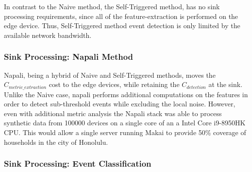 In contrast to the Naive method, the Self-Triggered method, has no sink processing requirements, since all of the feature-extraction is performed on the edge device.
Thus, Self-Triggered method event detection is only limited by the available network bandwidth.

\subsubsection{Sink Processing: Napali Method}

Napali, being a hybrid of Naive and Self-Triggered methods, moves the $C_{metric\_extraction}$ cost to the edge devices, while retaining
the $C_{detection}$ at the sink.
Unlike the Naive case, napali performs additional computations on the features in order to detect sub-threshold events while excluding the local noise.
However, even with additional metric analysis the Napali stack was able to process synthetic data from 100000 devices on a single core of an a Intel Core i9-8950HK CPU.
This would allow a single server running Makai to provide 50\% coverage of households in the city of Honolulu.

\subsubsection{Sink Processing: Event Classification}

